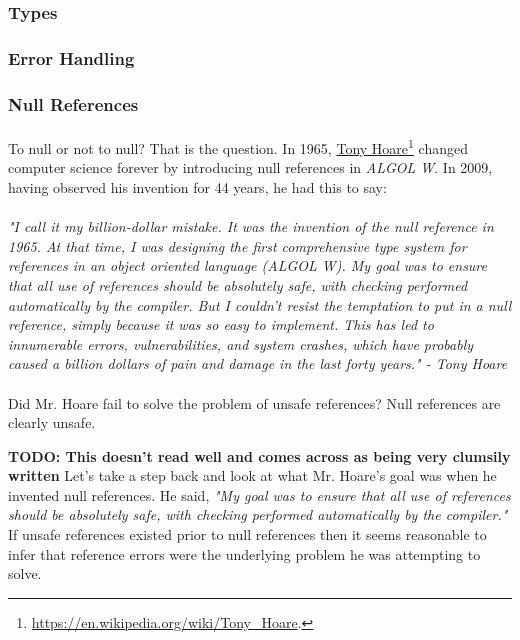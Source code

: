 \documentclass[hidelinks]{article}
\begin{document}
\subsubsection{Types}
\subsubsection{Error Handling}
\subsubsection{Null References}
\paragraph{}To null or not to null? That is the question. In 1965, \href{https://en.wikipedia.org/wiki/Tony_Hoare}{{\color{blue}Tony Hoare}}\footnote{\url{https://en.wikipedia.org/wiki/Tony_Hoare}.} changed computer science forever by introducing null references in \textit{ALGOL W}. In 2009, having observed his invention for 44 years, he had this to say:
\paragraph{}\textit{"I call it my billion-dollar mistake. It was the invention of the null reference in 1965. At that time, I was designing the first comprehensive type system for references in an object oriented language (ALGOL W). My goal was to ensure that all use of references should be absolutely safe, with checking performed automatically by the compiler. But I couldn't resist the temptation to put in a null reference, simply because it was so easy to implement. This has led to innumerable errors, vulnerabilities, and system crashes, which have probably caused a billion dollars of pain and damage in the last forty years." - Tony Hoare}

\paragraph{}Did Mr. Hoare fail to solve the problem of unsafe references? Null references are clearly unsafe.

\textbf{TODO: This doesn't read well and comes across as being very clumsily written}
Let's take a step back and look at what Mr. Hoare's goal was when he invented null references. He said, \textit{"My goal was to ensure that all use of references should be absolutely safe, with checking performed automatically by the compiler."} If unsafe references existed prior to null references then it seems reasonable to infer that reference errors were the underlying problem he was attempting to solve. 
\end{document}

